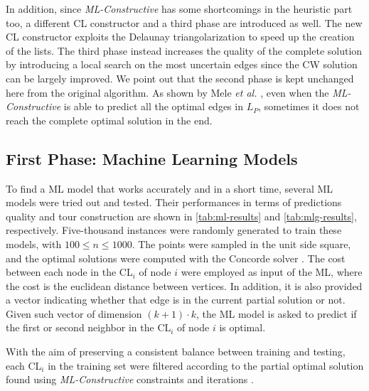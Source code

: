 \documentclass{article}
\begin{document}
\vspace{5 pt}

In addition, since \emph{ML-Constructive} has some shortcomings in the heuristic part too, a different CL constructor and a third phase are introduced as well.
The new CL constructor exploits the Delaunay triangolarization \cite{delaunay} to speed up the creation of the lists.
The third phase instead increases the quality of the complete solution by introducing a local search on the most uncertain edges since the CW solution can be largely improved.
We point out that the second phase is kept unchanged here from the original algorithm.
As shown by Mele \emph{et al.} \cite{mele:gambardella:montemanni}, even when the \emph{ML-Constructive} is able to predict all the optimal edges in $L_P$, sometimes it does not reach the complete optimal solution in the end.


\subsection{First Phase: Machine Learning Models}
To find a ML model that works accurately and in a short time, several ML models were tried out and tested.
Their performances in terms of predictions quality and tour construction are shown in \autoref{tab:ml-results} and \ref{tab:mlg-results}, respectively.
Five-thousand instances were randomly generated to train these models, with $100 \leq n \leq 1000$. 
The points were sampled in the unit side square, and the optimal solutions were computed with the Concorde solver \cite{applegate}.
The cost between each node in the CL$_i$ of node $i$ were employed as input of the ML, where the cost is the euclidean distance between vertices.
In addition, it is also provided a vector indicating whether that edge is in the current partial solution or not. 
Given such vector of dimension $(k + 1) \cdot k$, the ML model is asked to predict if the first or second neighbor in the CL$_i$ of node $i$ is optimal.

With the aim of preserving a consistent balance between training and testing, each CL$_i$ in the training set were filtered according to the partial optimal solution found using \emph{ML-Constructive} constraints and iterations \cite{mele:gambardella:montemanni}.
\end{document}
